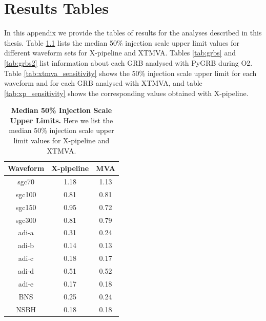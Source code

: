 \documentclass[11pt]{cuthesis}
\newcommand{\xp}{X-pipeline }
\newcommand{\xpfs}{X-pipeline. }
\begin{document}
\chapter{Results Tables} 
In this appendix we provide the tables of results for the analyses described in this thesis. Table \ref{appendix:mva tables} lists the median 50\% injection scale upper limit values for different waveform sets for \xp and XTMVA. Tables \ref{tab:grbs} and \ref{tab:grbs2} list information about each GRB analysed with PyGRB during O2. Table \ref{tab:xtmva_sensitivity} shows the 50\% injection scale upper limit for each waveform and for each GRB analysed with XTMVA, and table \ref{tab:xp_sensitivity} shows the corresponding values obtained with \xpfs

 
\begin{table}[h] 
\centering
\begin{tabular}{  c | c | c } 
Waveform   & X-pipeline & MVA \\ \hline                                                       
sgc70   & 1.18 & 1.13 \\
sgc100 & 0.81 & 0.81 \\
sgc150 & 0.95 & 0.72 \\
sgc300 & 0.81 & 0.79 \\
adi-a     & 0.31 & 0.24 \\
adi-b     & 0.14 & 0.13 \\
adi-c     & 0.18 & 0.17 \\
adi-d     & 0.51 & 0.52 \\
adi-e     & 0.17 & 0.18 \\
BNS     & 0.25 & 0.24 \\
NSBH   & 0.18 & 0.18 
\end{tabular}
\caption{\textbf{Median 50\% Injection Scale Upper Limits.} Here we list the median 50\% injection scale upper limit values for \xp and XTMVA. }
\label{appendix:mva tables}
\end{table}
\end{document}
